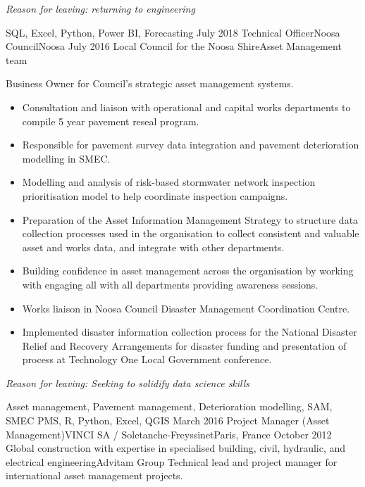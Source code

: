 \begin{experiences}
{\begin{itemize}
                      \end{itemize}
                     \textit{Reason for leaving: returning to engineering}  
                    }
                    {SQL, Excel, Python, Power BI, Forecasting}
  \emptySeparator
  \consultantexperience
    {July 2018} {Technical Officer}{Noosa Council}{Noosa}
    {July 2016}   {Local Council for the Noosa Shire}{Asset Management team}
      {Business Owner for Council's strategic asset management systems.
                      \begin{itemize}
		\item Consultation and liaison with operational and capital works departments to compile 5 year pavement reseal program.
		\item Responsible for pavement survey data integration and pavement deterioration modelling in SMEC.
		\item Modelling and analysis of risk-based stormwater network inspection prioritisation model to help coordinate inspection campaigns.
		\item Preparation of the Asset Information Management Strategy to structure data collection processes used in the organisation to collect consistent and valuable asset and works data, and integrate with other departments.
		\item Building confidence in asset management across the organisation by working with engaging all with all departments providing awareness sessions.
		\item Works liaison in Noosa Council Disaster Management Coordination Centre.
		\item Implemented disaster information collection process for the National Disaster Relief and Recovery Arrangements for disaster funding and presentation of process at Technology One Local Government conference.                                
                      \end{itemize}
                       \textit{Reason for leaving: Seeking to solidify data science skills}
                    }
                    {Asset management, Pavement management, Deterioration modelling, SAM, SMEC PMS, R, Python, Excel, QGIS}
  \emptySeparator
  \consultantexperience
    {March 2016}     {Project Manager (Asset Management)}{VINCI SA / Soletanche-Freyssinet}{Paris, France}
    {October 2012}   {Global construction with expertise in specialised building, civil, hydraulic, and electrical engineering}{Advitam Group}
      {Technical lead and project manager for international asset management projects.
}
\end{experiences}
